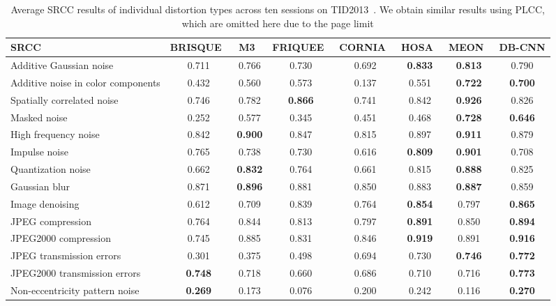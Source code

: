 \documentclass[journal]{IEEEtran}
\begin{document}
\begin{table*}[t]
  \centering
  \caption{Average SRCC results of individual distortion types across ten sessions on TID2013~\cite{ponomarenko2013color}. We obtain similar results using PLCC, which are omitted here due to the page limit}\label{tab:tid_idd}
  \begin{tabular}{l|cccccc|c}
      \toprule
SRCC & BRISQUE~\cite{mittal2012no} & M3~\cite{xue2014blind} & FRIQUEE~\cite{ghadiyaram2017perceptual} &
            CORNIA~\cite{ye2012unsupervised} & HOSA~\cite{xu2016blind} & MEON~\cite{Ma2018End} & DB-CNN \\
     \hline

      Additive Gaussian noise & 0.711 & 0.766 & 0.730 & 0.692 & {\bf 0.833} & {\bf 0.813} & 0.790 \\
      Additive noise in color components & 0.432 & 0.560 & 0.573 & 0.137 & 0.551 & {\bf 0.722} & {\bf 0.700} \\
        Spatially correlated noise & 0.746 & 0.782 & {\bf 0.866} & 0.741 & 0.842 & {\bf 0.926} & 0.826 \\
      Masked noise & 0.252 & 0.577 & 0.345 & 0.451 & 0.468 & {\bf 0.728} & {\bf 0.646} \\
      High frequency noise & 0.842 & {\bf 0.900} & 0.847 & 0.815 & 0.897 & {\bf 0.911} & 0.879 \\
      Impulse noise & 0.765 & 0.738 & 0.730 & 0.616 & {\bf 0.809} & {\bf 0.901} & 0.708 \\
            Quantization noise & 0.662 & {\bf 0.832} & 0.764 & 0.661 & 0.815 & {\bf 0.888} & 0.825 \\
            Gaussian blur & 0.871 & {\bf 0.896} & 0.881 & 0.850 & 0.883 & {\bf 0.887} & 0.859 \\
            Image denoising & 0.612 & 0.709 & 0.839 & 0.764 & {\bf 0.854} & 0.797 & {\bf 0.865} \\
            JPEG compression & 0.764 & 0.844 & 0.813 & 0.797 & {\bf 0.891} & 0.850 & {\bf 0.894} \\
            JPEG2000 compression & 0.745 & 0.885 & 0.831 & 0.846 & {\bf 0.919} & 0.891 & {\bf 0.916} \\
            JPEG transmission errors & 0.301 & 0.375 & 0.498 & 0.694 & 0.730 & {\bf 0.746} & {\bf 0.772} \\
            JPEG2000 transmission errors & {\bf 0.748} & 0.718 & 0.660 & 0.686 & 0.710 & 0.716 & {\bf 0.773} \\
            Non-eccentricity pattern noise & {\bf 0.269} & 0.173 & 0.076 & 0.200 & 0.242 & 0.116 & {\bf 0.270} \\

\end{tabular}
\end{table*}
\end{document}
